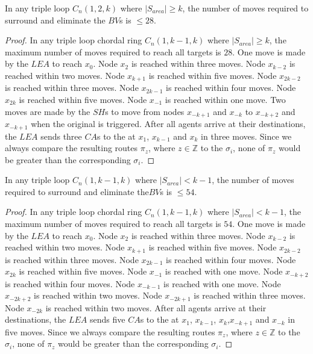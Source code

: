  
 \begin{theorem}
In any triple loop   $C_n(1,2,k)$ where $\left\vert{S_{area}}\right\vert \ge k$,  the number of moves required to surround and eliminate the $BV$s is $\leq28$.
\end{theorem}
 \begin{proof}
In any triple loop chordal ring $C_n(1,k-1,k)$ where $\left\vert{S_{area}}\right\vert \ge k$, the maximum number of moves required to reach all targets is $28$. 
One move is made by the $LEA$ to reach $x_0$.
 Node $x_{2}$ is reached within three moves.
Node $x_{k-2}$ is reached within two moves.
Node $x_{k+1}$ is reached within five moves.
Node $x_{2k-2}$ is reached within three moves.
Node $x_{2k-1}$ is reached within four moves.
Node $x_{2k}$ is reached within five moves.
 Node $x_{-1}$ is reached within one move.
 Two moves are made by the $SH$s to move from  nodes $x_{-k+1}$ and $x_{-k}$ to $x_{-k+2}$ and $x_{-k+1}$  when the original \bv is triggered.
After all agents arrive at their destinations, the $LEA$ sends three $CA$s to the \bvs at $x_{1}$, $x_{k-1}$ and $x_{k}$ in three moves. Since we always compare the resulting routes $\pi_z$, where $z \in \mathbb{Z}$  to the  $\sigma_i$, none of $\pi_z$ would be greater than the corresponding $\sigma_i$. 
\end{proof}

\begin{theorem}
In any triple loop   $C_n(1,k-1,k)$ where $\left\vert{S_{area}}\right\vert < k-1$,  the number of moves required to surround and eliminate the$BV$s  is $\leq54$.
\end{theorem}
 \begin{proof}
In any triple loop chordal ring $C_n(1,k-1,k)$ where $\left\vert{S_{area}}\right\vert <k-1$, the maximum number of moves required to reach all targets is $54$. One move is made by the $LEA$ to reach $x_0$.
 Node $x_{2}$ is reached within three moves.
 Node $x_{k-2}$ is reached within two moves.
Node $x_{k+1}$ is reached within five moves.
 Node $x_{2k-2}$ is reached within three moves.
Node $x_{2k-1}$ is reached within four moves.
 Node $x_{2k}$ is reached within five moves.
 Node $x_{-1}$ is reached with one move.
Node $x_{-k+2}$ is reached within four moves.
 Node $x_{-k-1}$ is reached with one move.
 Node $x_{-2k+2}$ is reached within two moves.
Node $x_{-2k+1}$ is reached within three moves.
 Node $x_{-2k}$ is reached within two moves.
 After all agents arrive at their destinations, the $LEA$ sends five $CA$s to the \bvs at $x_{1}$, $x_{k-1}$, $x_{k}$,$x_{-k+1}$ and $x_{-k}$ in five moves. Since we always compare the resulting routes $\pi_z$, where $z \in \mathbb{Z}$  to the  $\sigma_i$, none of $\pi_z$ would be greater than the corresponding $\sigma_i$. 
\end{proof}

